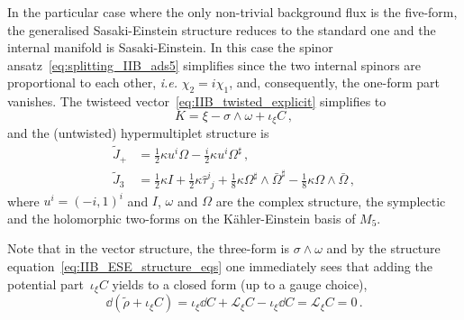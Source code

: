\documentclass[debug]{phd}
\begin{document}
In the particular case where the only non-trivial background flux is the five-form, the generalised Sasaki-Einstein structure reduces to the standard one and the internal manifold is Sasaki-Einstein.
In this case the spinor ansatz~\eqref{eq:splitting_IIB_ads5} simplifies since the two internal spinors are proportional to each other, \emph{i.e.} $\chi_2=i \chi_1$, and, consequently, the one-form part vanishes.
The twisteed vector~\eqref{eq:IIB_twisted_explicit} simplifies to
%
	\begin{equation} 
		K = \xi - \sigma \wedge \omega + \iota_{\xi}C\, , 
	\end{equation}  
%
and the (untwisted) hypermultiplet structure is~\cite{AshmoreESE}
%
	\begin{align}
	\label{Jstruct}
		\tilde{J}_+ &= \tfrac{1}{2}\kappa u^i \Omega - \tfrac{i}{2} \kappa u^i \Omega^{\sharp}\, ,\\[1mm]
		\tilde{J}_3 &= \tfrac{1}{2}\kappa I + \tfrac{1}{2} \kappa \hat{\tau}^{i}_{\phantom{i}j} + \tfrac{1}{8}\kappa \Omega^{\sharp}\wedge \bar{\Omega}^{\sharp} - \tfrac{1}{8}\kappa \Omega \wedge \bar{\Omega} \, , 
	\end{align}
where $u^i = (-i, 1)^i$ and $I$, $\omega$ and $\Omega$ are the complex structure, the symplectic and the holomorphic two-forms on the K\"ahler-Einstein basis of $M_5$. 

Note that in the vector structure, the three-form is $\sigma \wedge \omega$ and by the structure equation~\eqref{eq:IIB_ESE_structure_eqs} one immediately sees that adding the potential part~$\iota_{\xi}C$ yields to a closed form (up to a gauge choice),
%
	\begin{equation} 
		\dd  \left( \tilde{\rho}+\iota_{\xi}C \right)= \iota_{\xi} \dd  C + \mathcal{L}_{\xi} C - \iota_{\xi} \dd  C = \mathcal{L}_{\xi} C = 0\, .
	\end{equation} 
%
\end{document}
